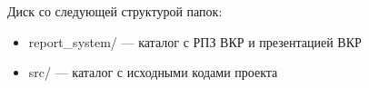 
Диск со следующей структурой папок:
\begin{itemize}
    \item report\_system/ --- каталог с РПЗ ВКР и презентацией ВКР
    \item src/ --- каталог с исходными кодами проекта
\end{itemize}

\clearpage